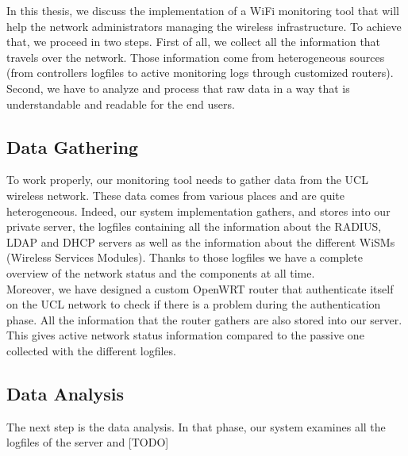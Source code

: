 In this thesis, we discuss the implementation of a WiFi monitoring tool that will help the network administrators managing the wireless infrastructure. To achieve that, we proceed in two steps. First of all, we collect all the information that travels over the network. Those information come from heterogeneous sources (from controllers logfiles to active monitoring logs through customized routers). Second, we have to analyze and process that raw data in a way that is understandable and readable for the end users.

\subsection{Data Gathering}

To work properly, our monitoring tool needs to gather data from the UCL wireless network. These data comes from various places and are quite heterogeneous. Indeed, our system implementation gathers, and stores into our private server, the logfiles containing all the information about the RADIUS, LDAP and DHCP servers as well as the information about the different WiSMs (Wireless Services Modules). Thanks to those logfiles we have a complete overview of the network status and the components at all time.\\

Moreover, we have designed a custom OpenWRT router that authenticate itself on the UCL network to check if there is a problem during the authentication phase. All the information that the router gathers are also stored into our server. This gives active network status information compared to the passive one collected with the different logfiles.


\subsection{Data Analysis}
The next step is the data analysis. In that phase, our system examines all the logfiles of the server and [TODO]




